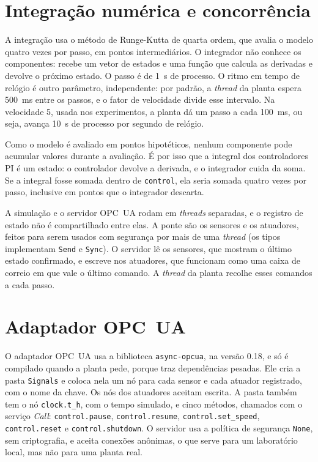 \section{Integração numérica e concorrência}
\label{apC:integracao}

A integração usa o método de Runge-Kutta de quarta ordem, que avalia o modelo quatro vezes por passo, em pontos intermediários. O integrador não conhece os componentes: recebe um vetor de estados e uma função que calcula as derivadas e devolve o próximo estado. O passo é de 1~s de processo. O ritmo em tempo de relógio é outro parâmetro, independente: por padrão, a \textit{thread} da planta espera 500~ms entre os passos, e o fator de velocidade divide esse intervalo. Na velocidade 5, usada nos experimentos, a planta dá um passo a cada 100~ms, ou seja, avança 10~s de processo por segundo de relógio.

Como o modelo é avaliado em pontos hipotéticos, nenhum componente pode acumular valores durante a avaliação. É por isso que a integral dos controladores PI é um estado: o controlador devolve a derivada, e o integrador cuida da soma. Se a integral fosse somada dentro de \texttt{control}, ela seria somada quatro vezes por passo, inclusive em pontos que o integrador descarta.

A simulação e o servidor OPC~UA rodam em \textit{threads} separadas, e o registro de estado não é compartilhado entre elas. A ponte são os sensores e os atuadores, feitos para serem usados com segurança por mais de uma \textit{thread} (os tipos implementam \texttt{Send} e \texttt{Sync}). O servidor lê os sensores, que mostram o último estado confirmado, e escreve nos atuadores, que funcionam como uma caixa de correio em que vale o último comando. A \textit{thread} da planta recolhe esses comandos a cada passo.

\section{Adaptador OPC~UA}
\label{apC:opcua}

O adaptador OPC~UA usa a biblioteca \texttt{async-opcua}, na versão 0.18, e só é compilado quando a planta pede, porque traz dependências pesadas. Ele cria a pasta \texttt{Signals} e coloca nela um nó para cada sensor e cada atuador registrado, com o nome da chave. Os nós dos atuadores aceitam escrita. A pasta também tem o nó \texttt{clock.t\_h}, com o tempo simulado, e cinco métodos, chamados com o serviço \textit{Call}: \texttt{control.pause}, \texttt{control.resume}, \texttt{control.set\_speed}, \texttt{control.reset} e \texttt{control.shutdown}. O servidor usa a política de segurança \texttt{None}, sem criptografia, e aceita conexões anônimas, o que serve para um laboratório local, mas não para uma planta real.

